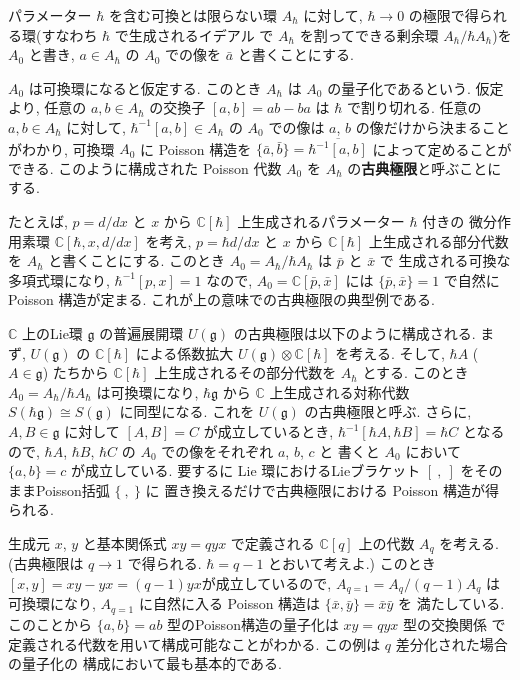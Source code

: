 \documentclass[12pt,twoside,dvipdfm]{msjproc}
\newcommand\C{{\mathbb C}} %
\theoremstyle{definition} %
\theoremstyle{definition} %
\theoremstyle{definition} %
\numberwithin{theorem}{section}
\numberwithin{equation}{section}
\numberwithin{figure}{section}
\numberwithin{table}{section}
\newcommand\g{\mathfrak{g}}
\begin{document}
パラメーター $\hbar$ を含む可換とは限らない環 $A_\hbar$ に対して, 
$\hbar\to 0$ の極限で得られる環(すなわち $\hbar$ で生成されるイデアル
で $A_\hbar$ を割ってできる剰余環 $A_\hbar/\hbar A_\hbar$)を $A_0$ と書き, 
$a\in A_\hbar$ の $A_0$ での像を $\bar{a}$ と書くことにする.

$A_0$ は可換環になると仮定する. 
このとき $A_\hbar$ は $A_0$ の量子化であるという.
仮定より, 任意の $a,b\in A_\hbar$ の交換子 $[a,b]=ab-ba$ は $\hbar$ で割り切れる.
任意の $a,b\in A_\hbar$ に対して,  
$\hbar^{-1}[a,b]\in A_\hbar$ の $A_0$ での像は $a$, $b$ の像だけから決まることがわかり, 
可換環 $A_0$ に Poisson 構造を
\(
 \{\bar{a}, \bar{b}\} = \overline{\hbar^{-1}[a,b]}
\)
によって定めることができる.
このように構成された Poisson 代数 $A_0$ を $A_\hbar$ の{\bf 古典極限}と呼ぶことにする.

たとえば, $p=d/dx$ と $x$ から $\C[\hbar]$ 上生成されるパラメーター $\hbar$ 付きの
微分作用素環 $\C[\hbar, x, d/dx]$ を考え, 
$p=\hbar d/dx$ と $x$ から $\C[\hbar]$ 上生成される部分代数を $A_\hbar$ と書くことにする.
このとき $A_0=A_\hbar/\hbar A_\hbar$ は $\bar{p}$ と $\bar{x}$ で
生成される可換な多項式環になり,  $\hbar^{-1}[p,x]=1$ なので, 
$A_0=\C[\bar{p},\bar{x}]$ には $\{\bar{p},\bar{x}\}=1$ で自然に Poisson 構造が定まる.
これが上の意味での古典極限の典型例である.  

$\C$ 上のLie環 $\g$ の普遍展開環 $U(\g)$ の古典極限は以下のように構成される.
まず, $U(\g)$ の $\C[\hbar]$ による係数拡大 $U(\g)\otimes\C[\hbar]$ を考える.
そして, $\hbar A$ ($A\in\g$) たちから $\C[\hbar]$ 上生成されるその部分代数を $A_\hbar$
とする.  このとき $A_0=A_\hbar/\hbar A_\hbar$ は可換環になり, 
$\hbar\g$ から $\C$ 上生成される対称代数 $S(\hbar\g)\cong S(\g)$ に同型になる.
これを $U(\g)$ の古典極限と呼ぶ.
さらに, $A,B\in\g$ に対して $[A,B]=C$ が成立しているとき, 
$\hbar^{-1}[\hbar A, \hbar B]=\hbar C$ となるので, 
$\hbar A$, $\hbar B$, $\hbar C$ の $A_0$ での像をそれぞれ $a$, $b$, $c$ と
書くと $A_0$ において $\{a,b\}=c$ が成立している.
要するに Lie 環におけるLieブラケット $[\ ,\ ]$ をそのままPoisson括弧 $\{\ ,\ \}$ に
置き換えるだけで古典極限における Poisson 構造が得られる.

生成元 $x$, $y$ と基本関係式 $xy=qyx$ で定義される $\C[q]$ 上の代数 $A_q$ を考える.
(古典極限は $q\to 1$ で得られる.  $\hbar=q-1$ とおいて考えよ.)
このとき $[x,y]=xy-yx=(q-1)yx$が成立しているので,  $A_{q=1}=A_q/(q-1)A_q$ は
可換環になり,  $A_{q=1}$ に自然に入る Poisson 構造は $\{\bar{x},\bar{y}\}=\bar{x}\bar{y}$ を
満たしている.  このことから $\{a,b\}=ab$ 型のPoisson構造の量子化は $xy=qyx$ 型の交換関係
で定義される代数を用いて構成可能なことがわかる.  この例は $q$ 差分化された場合の量子化の
構成において最も基本的である.
\end{document}
